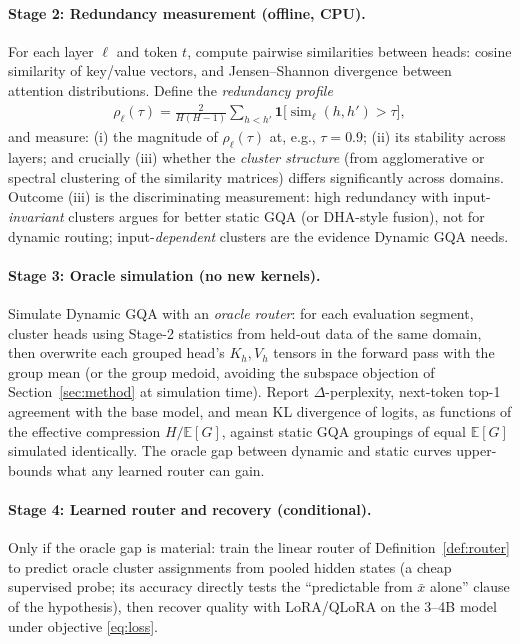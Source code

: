 \documentclass{article}
\newcommand{\E}{\mathbb{E}}
\begin{document}
\paragraph{Stage 2: Redundancy measurement (offline, CPU).}
For each layer $\ell$ and token $t$, compute pairwise similarities between
heads: cosine similarity of key/value vectors, and Jensen--Shannon
divergence between attention distributions. Define the \emph{redundancy
profile}
\begin{align}
\rho_\ell(\tau)
= \frac{2}{H(H-1)} \sum_{h < h'} \mathbf{1}\big[\operatorname{sim}_\ell(h, h') > \tau\big],
\end{align}
and measure: (i) the magnitude of $\rho_\ell(\tau)$ at, e.g., $\tau = 0.9$;
(ii) its stability across layers; and crucially (iii) whether the
\emph{cluster structure} (from agglomerative or spectral clustering of the
similarity matrices) differs significantly across domains. Outcome (iii) is
the discriminating measurement: high redundancy with input-\emph{invariant}
clusters argues for better static GQA (or DHA-style fusion), not for dynamic
routing; input-\emph{dependent} clusters are the evidence Dynamic GQA needs.

\paragraph{Stage 3: Oracle simulation (no new kernels).}
Simulate Dynamic GQA with an \emph{oracle router}: for each evaluation
segment, cluster heads using Stage-2 statistics from held-out data of the
same domain, then overwrite each grouped head's $K_h, V_h$ tensors in the
forward pass with the group mean (or the group medoid, avoiding the subspace
objection of Section~\ref{sec:method} at simulation time). Report
$\Delta$-perplexity, next-token top-1 agreement with the base model, and
mean KL divergence of logits, as functions of the effective compression
$H/\E[G]$, against static GQA groupings of equal $\E[G]$ simulated
identically. The oracle gap between dynamic and static curves upper-bounds
what any learned router can gain.

\paragraph{Stage 4: Learned router and recovery (conditional).}
Only if the oracle gap is material: train the linear router of
Definition~\ref{def:router} to predict oracle cluster assignments from
pooled hidden states (a cheap supervised probe; its accuracy directly tests
the ``predictable from $\bar x$ alone'' clause of the hypothesis), then
recover quality with LoRA/QLoRA \citep{hu2022lora,dettmers2023qlora} on the
3--4B model under objective \eqref{eq:loss}.
\end{document}
